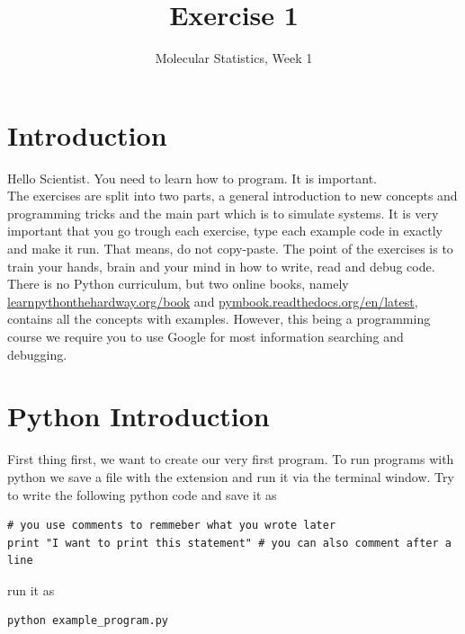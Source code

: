 \documentclass{article}
\title{Exercise 1}
\author{Molecular Statistics, Week 1}
\date{}
\begin{document}

\maketitle

\section*{Introduction}

Hello Scientist. You need to learn how to program. It is important.\\

The exercises are split into two parts, a general introduction to new concepts and programming tricks and the main part which is to simulate systems.
It is very important that you go trough each exercise, type each example code in exactly and make it run.
That means, do not copy-paste.
The point of the exercises is to train your hands, brain and your mind in how to write, read and debug code.\\


There is no Python curriculum, but two online books, namely
\href{http://learnpythonthehardway.org/book/}{learnpythonthehardway.org/book} and
\href{http://pymbook.readthedocs.org/en/latest/}{pymbook.readthedocs.org/en/latest},
contains all the concepts with examples.
However, this being a programming course we require you to use Google for most information searching and debugging.

\newpage
\section{Python Introduction}

First thing first, we want to create our very first program.
To run programs with python we save a file with the extension  and run it via the terminal window.
Try to write the following python code and save it as 

\begin{lstlisting}
# you use comments to remmeber what you wrote later
print "I want to print this statement" # you can also comment after a line
\end{lstlisting}

run it as

\begin{lstlisting}
python example_program.py
\end{lstlisting}
\end{document}
